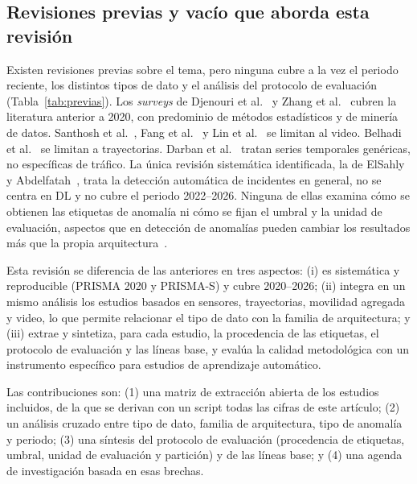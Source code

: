 \documentclass[12pt, a4paper]{article}
\begin{document}
\subsection{Revisiones previas y vac\'{i}o que aborda esta revisi\'{o}n}
\label{sec:previas}

Existen revisiones previas sobre el tema, pero ninguna cubre a la vez el periodo reciente, los distintos tipos de dato y el an\'{a}lisis del protocolo de evaluaci\'{o}n (Tabla~\ref{tab:previas}). Los \textit{surveys} de Djenouri et al.~\cite{djenouri2019survey} y Zhang et al.~\cite{zhang2020urban} cubren la literatura anterior a 2020, con predominio de m\'{e}todos estad\'{i}sticos y de miner\'{i}a de datos. Santhosh et al.~\cite{santhosh2020anomaly}, Fang et al.~\cite{fang2024vision} y Lin et al.~\cite{lin2025deep} se limitan al video. Belhadi et al.~\cite{belhadi2020trajectory} se limitan a trayectorias. Darban et al.~\cite{darban2024deep} tratan series temporales gen\'{e}ricas, no espec\'{i}ficas de tr\'{a}fico. La \'{u}nica revisi\'{o}n sistem\'{a}tica identificada, la de ElSahly y Abdelfatah~\cite{elsahly2022systematic}, trata la detecci\'{o}n autom\'{a}tica de incidentes en general, no se centra en DL y no cubre el periodo 2022--2026. Ninguna de ellas examina c\'{o}mo se obtienen las etiquetas de anomal\'{i}a ni c\'{o}mo se fijan el umbral y la unidad de evaluaci\'{o}n, aspectos que en detecci\'{o}n de anomal\'{i}as pueden cambiar los resultados m\'{a}s que la propia arquitectura~\cite{darban2024deep}.



Esta revisi\'{o}n se diferencia de las anteriores en tres aspectos: (i) es sistem\'{a}tica y reproducible (PRISMA 2020 y PRISMA-S) y cubre 2020--2026; (ii) integra en un mismo an\'{a}lisis los estudios basados en sensores, trayectorias, movilidad agregada y video, lo que permite relacionar el tipo de dato con la familia de arquitectura; y (iii) extrae y sintetiza, para cada estudio, la procedencia de las etiquetas, el protocolo de evaluaci\'{o}n y las l\'{i}neas base, y eval\'{u}a la calidad metodol\'{o}gica con un instrumento espec\'{i}fico para estudios de aprendizaje autom\'{a}tico.

Las contribuciones son: (1) una matriz de extracci\'{o}n abierta de los estudios incluidos, de la que se derivan con un script todas las cifras de este art\'{i}culo; (2) un an\'{a}lisis cruzado entre tipo de dato, familia de arquitectura, tipo de anomal\'{i}a y periodo; (3) una s\'{i}ntesis del protocolo de evaluaci\'{o}n (procedencia de etiquetas, umbral, unidad de evaluaci\'{o}n y partici\'{o}n) y de las l\'{i}neas base; y (4) una agenda de investigaci\'{o}n basada en esas brechas.
\end{document}
